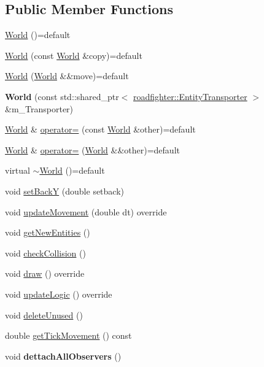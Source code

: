 \subsection*{Public Member Functions}
\begin{DoxyCompactItemize}
\item 
\hyperlink{classroadfighter_1_1World_aa75df604422c5e2f160d082da86a50c4}{World} ()=default
\item 
\hyperlink{classroadfighter_1_1World_aa2f34c06cc3b81a6cd3f862137f1786b}{World} (const \hyperlink{classroadfighter_1_1World}{World} \&copy)=default
\item 
\hyperlink{classroadfighter_1_1World_aabd6663f3ee5533809152f154064cd89}{World} (\hyperlink{classroadfighter_1_1World}{World} \&\&move)=default
\item 
\mbox{\label{classroadfighter_1_1World_ad1c38e0c158813af36113953003362d1}} 
{\bfseries World} (const std\+::shared\+\_\+ptr$<$ \hyperlink{classroadfighter_1_1EntityTransporter}{roadfighter\+::\+Entity\+Transporter} $>$ \&m\+\_\+\+Transporter)
\item 
\hyperlink{classroadfighter_1_1World}{World} \& \hyperlink{classroadfighter_1_1World_a31482bef8cfc86abc6326a4ffca74872}{operator=} (const \hyperlink{classroadfighter_1_1World}{World} \&other)=default
\item 
\hyperlink{classroadfighter_1_1World}{World} \& \hyperlink{classroadfighter_1_1World_ae2c0a8c3c8abd624087d5c5d82c2d5fd}{operator=} (\hyperlink{classroadfighter_1_1World}{World} \&\&other)=default
\item 
virtual \hyperlink{classroadfighter_1_1World_aea82fc8fead2cfb0032de65b1a198058}{$\sim$\+World} ()=default
\item 
void \hyperlink{classroadfighter_1_1World_abaf87df4c66473070ccf57bacbe56419}{set\+BackY} (double setback)
\item 
void \hyperlink{classroadfighter_1_1World_a880776b589376b1b4fd5ed4f26de4482}{update\+Movement} (double dt) override
\item 
void \hyperlink{classroadfighter_1_1World_a8d20efd557fc36fdf6218c0fdedd0b5a}{get\+New\+Entities} ()
\item 
void \hyperlink{classroadfighter_1_1World_ad04348a1285e8246abfacf32b600866f}{check\+Collision} ()
\item 
void \hyperlink{classroadfighter_1_1World_a90534263a154d6d7c1e8aef4e0138881}{draw} () override
\item 
void \hyperlink{classroadfighter_1_1World_a066592a75c8a38e241013707b429206c}{update\+Logic} () override
\item 
void \hyperlink{classroadfighter_1_1World_af7b77b0be8fee9e26093e2990f3889aa}{delete\+Unused} ()
\item 
double \hyperlink{classroadfighter_1_1World_a37fb93dcb90ec720a4ef17c43cf64dd4}{get\+Tick\+Movement} () const
\item 
\mbox{\label{classroadfighter_1_1World_a82f62356ff13d7b52372f5568803686d}} 
void {\bfseries dettach\+All\+Observers} ()
\end{DoxyCompactItemize}



